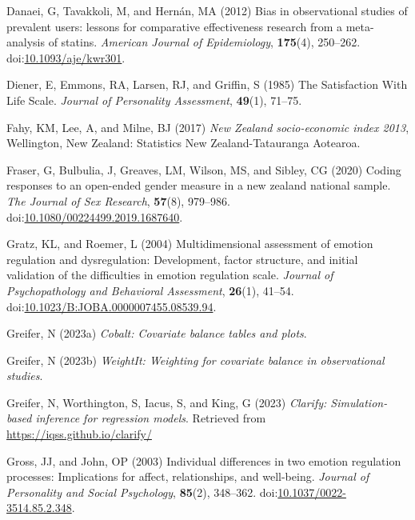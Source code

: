 \documentclass[
  singlecolumn,
  9pt]{scrartcl}
\newlength{\cslhangindent}
\newenvironment{CSLReferences}[2] %
 {\begin{list}{}{%
  \setlength{\itemindent}{0pt}
  \setlength{\leftmargin}{0pt}
  \setlength{\parsep}{0pt}
  \ifodd #1
   \setlength{\leftmargin}{\cslhangindent}
   \setlength{\itemindent}{-1\cslhangindent}
  \fi
  \setlength{\itemsep}{#2\baselineskip}}}
 {\end{list}}
\begin{document}
\begin{CSLReferences}{1}{0}
Danaei, G, Tavakkoli, M, and Hernán, MA (2012) Bias in observational
studies of prevalent users: lessons for comparative effectiveness
research from a meta-analysis of statins. \emph{American Journal of
Epidemiology}, \textbf{175}(4), 250--262.
doi:\href{https://doi.org/10.1093/aje/kwr301}{10.1093/aje/kwr301}.

Diener, E, Emmons, RA, Larsen, RJ, and Griffin, S (1985) The
Satisfaction With Life Scale. \emph{Journal of Personality Assessment},
\textbf{49}(1), 71--75.

Fahy, KM, Lee, A, and Milne, BJ (2017) \emph{New Zealand socio-economic
index 2013}, Wellington, New Zealand: Statistics New Zealand-Tatauranga
Aotearoa.

Fraser, G, Bulbulia, J, Greaves, LM, Wilson, MS, and Sibley, CG (2020)
Coding responses to an open-ended gender measure in a new zealand
national sample. \emph{The Journal of Sex Research}, \textbf{57}(8),
979--986.
doi:\href{https://doi.org/10.1080/00224499.2019.1687640}{10.1080/00224499.2019.1687640}.

Gratz, KL, and Roemer, L (2004) Multidimensional assessment of emotion
regulation and dysregulation: Development, factor structure, and initial
validation of the difficulties in emotion regulation scale.
\emph{Journal of Psychopathology and Behavioral Assessment},
\textbf{26}(1), 41--54.
doi:\href{https://doi.org/10.1023/B:JOBA.0000007455.08539.94}{10.1023/B:JOBA.0000007455.08539.94}.

Greifer, N (2023a) \emph{Cobalt: Covariate balance tables and plots}.

Greifer, N (2023b) \emph{WeightIt: Weighting for covariate balance in
observational studies}.

Greifer, N, Worthington, S, Iacus, S, and King, G (2023) \emph{Clarify:
Simulation-based inference for regression models}. Retrieved from
\url{https://iqss.github.io/clarify/}

Gross, JJ, and John, OP (2003) Individual differences in two emotion
regulation processes: Implications for affect, relationships, and
well-being. \emph{Journal of Personality and Social Psychology},
\textbf{85}(2), 348--362.
doi:\href{https://doi.org/10.1037/0022-3514.85.2.348}{10.1037/0022-3514.85.2.348}.


\end{CSLReferences}
\end{document}
